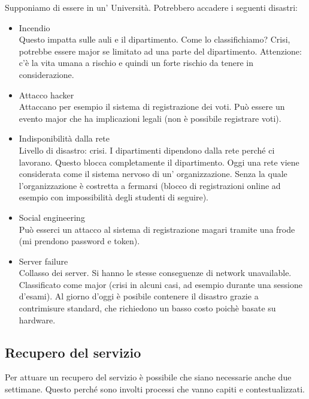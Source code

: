 Supponiamo di essere in un' Università.
Potrebbero accadere i seguenti disastri:
\begin{itemize}
 \item Incendio \\
 Questo impatta sulle auli e il dipartimento. Come lo 
classifichiamo? Crisi, potrebbe essere major se limitato ad una parte del 
dipartimento. Attenzione: c'è la vita umana a rischio e quindi un forte 
rischio da tenere in considerazione.

 \item Attacco hacker \\
 Attaccano per esempio il sistema di registrazione dei voti. Può essere un 
evento major che ha implicazioni legali (non \`e possibile registrare voti).

 \item Indisponibilità dalla rete \\
 Livello di disastro: crisi. I dipartimenti dipendono dalla rete perché 
ci lavorano. Questo blocca completamente il dipartimento. Oggi una rete viene 
considerata come il sistema nervoso di un' organizzazione. Senza la quale 
l'organizzazione \`e costretta a fermarsi (blocco di registrazioni online ad 
esempio con impossibilità degli studenti di seguire).

 \item Social engineering \\
 Può esserci un attacco al sistema di registrazione magari tramite una frode 
(mi prendono password e token).

 \item Server failure \\
 Collasso dei server. Si hanno le stesse conseguenze di network unavailable. 
Classificato come major (crisi in alcuni casi, ad esempio durante una sessione 
d'esami). Al giorno d'oggi è posibile contenere il disastro grazie a contrimisure
standard, che richiedono un basso costo poichè basate su hardware.
\end{itemize}

\subsection{Recupero del servizio}

Per attuare un recupero del servizio è possibile che siano necessarie anche due settimane. 
Questo perché sono involti processi che vanno capiti e contestualizzati.

